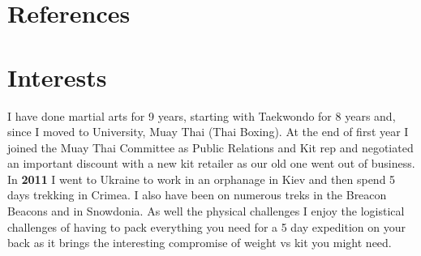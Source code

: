 \documentclass[11pt,a4paper,sans]{moderncv} %
\begin{document}

\section{References}

\section{Interests}

{
	I have done martial arts for 9 years, starting with Taekwondo for 8 years and, since I moved to University,  Muay Thai (Thai Boxing). At the end of first year I joined the Muay Thai Committee as Public Relations and Kit rep and negotiated an important discount with a new kit retailer as our old one went out of business. 
}
{
	In \textbf{2011} I went to Ukraine to work in an orphanage in Kiev and then spend 5 days trekking in Crimea. I also have been on numerous treks in the Breacon Beacons and in Snowdonia. As well the physical challenges I enjoy the logistical challenges of having to pack everything you need for a 5 day expedition on your back as it brings the interesting compromise of weight vs kit you might need.
}	
\end{document}
